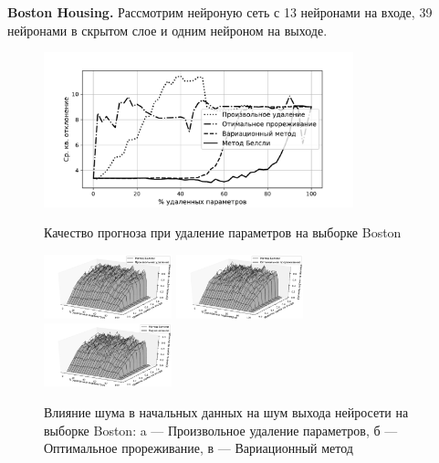 \textbf{Boston Housing. } Рассмотрим нейроную сеть с 13 нейронами на входе, 39 нейронами в скрытом слое и одним нейроном на выходе.

\begin{figure}[h    !t]\center
\includegraphics[width=0.8\textwidth]{plots/grabovoy/boston_all.pdf}\\
\caption{Качество прогноза при удаление параметров на выборке Boston}
\label{BostonAll}
\end{figure}



\begin{figure}[ht]\center
\includegraphics[width=0.33\textwidth]{plots/grabovoy/boston_random.pdf}
{\includegraphics[width=0.33\textwidth]{plots/grabovoy/boston_obd.pdf}}
{\includegraphics[width=0.33\textwidth]{plots/grabovoy/boston_var.pdf}}

\caption{Влияние шума в начальных данных на шум выхода нейросети на выборке Boston: a --- Произвольное удаление параметров, б --- Оптимальное прореживание, в --- Вариационный метод}
\label{BostonNoise}
\end{figure}

